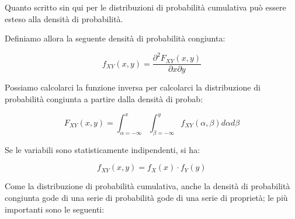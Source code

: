 Quanto scritto sin qui per le distribuzioni di probabilità cumulativa può essere esteso alla densità di probabilità. \newline 

Definiamo allora la seguente densità di probabilità congiunta: 

{
    \Large 
    \begin{equation}
        f_{XY} (x, y) 
        = 
        \frac{\partial ^{2} F_{XY} (x, y)}{\partial x \partial y}
    \end{equation}
}

Possiamo calcolarci la funzione inversa per calcolarci la distribuzione di probabilità congiunta a partire dalla densità di probab: 

{
    \Large 
    \begin{equation}
        F_{XY} (x, y) 
        =
        \int_{\alpha = -\infty}^{x}
        \int_{\beta = -\infty}^{y}
        f_{XY} (\alpha, \beta) 
        d\alpha d\beta 
    \end{equation}
}

Se le variabili sono statisticamente indipendenti, si ha: 

{
    \Large 
    \begin{equation}
        f_{XY} (x, y)
        = 
        f_{X} (x)
        \cdot
        f_{Y} (y)
    \end{equation}
}

Come la distribuzione di probabilità cumulativa, anche la densità di probabilità congiunta gode di una serie di probabilità 
gode di una serie di proprietà; le più importanti sono le seguenti: 

